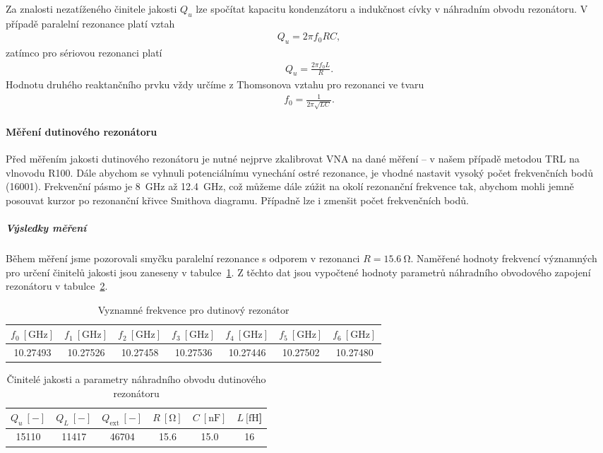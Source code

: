 \documentclass[11pt,a4paper]{article}
\newcommand{\Ohm}{\mathrm{\Omega}}
\newcommand{\GHz}{\mathrm{GHz}}
\begin{document}
Za znalosti nezatíženého činitele jakosti $Q_u$ lze spočítat kapacitu kondenzátoru a indukčnost cívky v náhradním obvodu rezonátoru. V případě paralelní rezonance platí vztah
\begin{align}
    Q_u = 2\pi f_0RC,
\end{align}
zatímco pro sériovou rezonanci platí
\begin{align}
    Q_u = \frac{2\pi f_0 L}{R}.
\end{align}
Hodnotu druhého reaktančního prvku vždy určíme z Thomsonova vztahu pro rezonanci ve tvaru
\begin{align}
    f_0 = \frac{1}{2\pi\sqrt{LC}}.
\end{align}

\paragraph*{Měření dutinového rezonátoru} Před měřením jakosti dutinového rezonátoru je nutné nejprve zkalibrovat VNA na dané měření -- v našem případě metodou TRL na vlnovodu R100. Dále abychom se vyhnuli potenciálnímu vynechání ostré rezonance, je vhodné nastavit vysoký počet frekvenčních bodů (16001). Frekvenční pásmo je 8~GHz až 12.4~GHz, což můžeme dále zúžit na okolí rezonanční frekvence tak, abychom mohli jemně posouvat kurzor po rezonanční křivce Smithova diagramu. Případně lze i zmenšit počet frekvenčních bodů.

\subparagraph*{Výsledky měření} Během měření jsme pozorovali smyčku paralelní rezonance s odporem v rezonanci $R = 15.6\ \Ohm$. Naměřené hodnoty frekvencí významných pro určení činitelů jakosti jsou zaneseny v tabulce~\ref{table:dutinovy-rezonator-frekvence}. Z těchto dat jsou vypočtené hodnoty parametrů náhradního obvodového zapojení rezonátoru v tabulce~\ref{table:dutinovy-rezonator-hodnoty}.
\begin{table}[!ht]
\centering
\begin{tabular}{|c|c|c|c|c|c|c|}
    \hline
    $f_0\ [\GHz]$ & $f_1\ [\GHz]$ & $f_2\ [\GHz]$ & $f_3\ [\GHz]$ & $f_4\ [\GHz]$ & $f_5\ [\GHz]$ & $f_6\ [\GHz]$\\
    \hline\hline
    10.27493 & 10.27526 & 10.27458 & 10.27536 & 10.27446 & 10.27502 & 10.27480\\
    \hline
\end{tabular}
\caption{\label{table:dutinovy-rezonator-frekvence}Vyznamné frekvence pro dutinový rezonátor}
\end{table}
\begin{table}[!ht]
\centering
\begin{tabular}{|c|c|c|c|c|c|}
    \hline
    $Q_u\ [-]$ & $Q_L\ [-]$ & $Q_{\mathrm{ext}}\ [-]$ & $R\ [\mathrm{\Omega}]$ & $C\ [\mathrm{nF}]$ & $L\ [\mathrm{fH}$]\\
    \hline\hline
    15110 & 11417 & 46704 & 15.6 & 15.0 & 16\\
    \hline
\end{tabular}
\caption{\label{table:dutinovy-rezonator-hodnoty}Činitelé jakosti a parametry náhradního obvodu dutinového rezonátoru}
\end{table}
\end{document}
